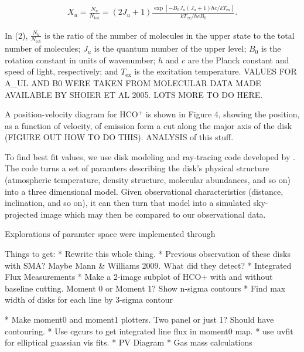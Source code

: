 \begin{align}
  X_u = \frac{N_u}{N_{\text{tot}}} = (2 J_u + 1) \frac{\exp [-B_0 J_u (J_u + 1) h c/kT_{\text{ex}}]}{kT_{\text{ex}}/hc B_0}.
\end{align}

In (2), $\frac{N_u}{N_{\text{tot}}}$ is the ratio of the number of molecules in the upper state to the total number of molecules; $J_u$ is the quantum number of the upper level; $B_0$ is the rotation constant in units of wavenumber; $h$ and $c$ are the Planck constant and speed of light, respectively; and $T_{\text{ex}}$ is the excitation temperature. VALUES FOR A_UL AND B0 WERE TAKEN FROM MOLECULAR DATA MADE AVAILABLE BY SHOIER ET AL 2005. LOTS MORE TO DO HERE.


A position-velocity diagram for HCO$^{+}$ is shown in Figure 4, showing the position, as a function of velocity, of emission form a cut along the major axis of the disk (FIGURE OUT HOW TO DO THIS).
ANALYSIS of this stuff.




To find best fit values, we use disk modeling and ray-tracing code developed by \citet{flaherty2013}. The code turns a set of paramters describing the disk's physical structure (atmospheric temperature, density structure, molecular abundances, and so on) into a three dimensional model. Given observational characteristics (distance, inclination, and so on), it can then turn that model into a simulated sky-projected image which may then be compared to our observational data.

Explorations of paramter space were implemented through



Things to get:
* Rewrite this whole thing.
* Previous observation of these disks with SMA? Maybe Mann & Williams 2009. What did they detect?
* Integrated Flux Measurements
* Make a 2-image subplot of HCO+ with and without baseline cutting. Moment 0 or Moment 1? Show n-sigma contours
  * Find max width of disks for each line by 3-sigma contour

* Make moment0 and moment1 plotters. Two panel or just 1? Should have contouring.
* Use cgcurs to get integrated line flux in moment0 map.
* use uvfit for elliptical guassian vis fits.
* PV Diagram
* Gas mass calculations





